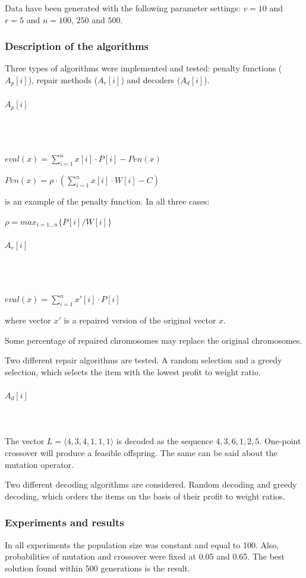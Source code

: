 \documentclass[12pt]{article}
\newcommand{\myparagraph}[1]{\paragraph{#1}\mbox{}\\\\}
\begin{document}
Data have been generated with the following parameter settings: $v = 10$ and $r = 5$ and $n = 100$, $250$ and $500$.

\subsubsection{Description of the algorithms}
Three types of algorithms were implemented and tested: penalty functions ($A_p[i]$), repair methods ($A_r[i]$) and decoders ($A_d[i]$).

\myparagraph{$A_p[i]$}
\begin{center}
$eval(x) = \sum_{i=1}^{n}x[i] \cdot P[i] - Pen(x)$
\end{center}
\begin{center}
$Pen(x) = \rho \cdot (\sum_{i=1}^{n}x[i] \cdot W[i] - C)$
\end{center}
is an example of the penalty function. In all three cases:
\begin{center}
$\rho = max_{i=1 \dots n}\{P[i]/W[i]\}$
\end{center}

\myparagraph{$A_r[i]$}
\begin{center}
$eval(x) = \sum_{i=1}^{n}x'[i] \cdot P[i]$
\end{center}
where vector $x'$ is a repaired version of the original vector $x$.

Some percentage of repaired chromosomes may replace the original chromosomes.

Two different repair algorithms are tested. A random selection and a greedy selection, which selects the item with the lowest profit to weight ratio.

\myparagraph{$A_d[i]$}
The vector $L = \langle 4,3,4,1,1,1 \rangle$ is decoded as the sequence $4, 3, 6, 1, 2, 5$. One-point crossover will produce a feasible offspring. The same can be said about the mutation operator.

Two different decoding algorithms are considered. Random decoding and greedy decoding, which orders the items on the basis of their profit to weight ratios.

\subsubsection{Experiments and results}
In all experiments the population size was constant and equal to 100. Also, probabilities of mutation and crossover were fixed at 0.05 and 0.65. The best solution found within 500 generations is the result.
\end{document}
